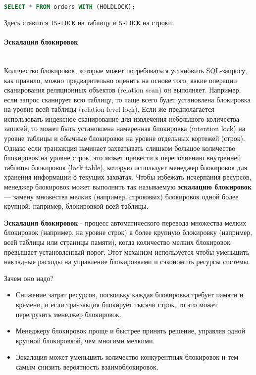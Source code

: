  \begin{lstlisting}[language=SQL]
     SELECT * FROM orders WITH (HOLDLOCK);
 \end{lstlisting}
 
 Здесь ставится \texttt{IS-LOCK} на таблицу и \texttt{S-LOCK} на строки.

\paragraph{Эскалация блокировок} ~\\

Количество блокировок, которые может потребоваться установить SQL-запросу, как правило, можно предварительно оценить на основе того, какие операции сканирования реляционных объектов (relation scan) он выполняет. Например, если запрос сканирует всю таблицу, то чаще всего будет установлена блокировка на уровне всей таблицы (relation-level lock). Если же предполагается использовать индексное сканирование для извлечения небольшого количества записей, то может быть установлена намеренная блокировка (intention lock) на уровне таблицы и обычные блокировки на уровне отдельных кортежей (строк). Однако если транзакция начинает захватывать слишком большое количество блокировок на уровне строк, это может привести к переполнению внутренней таблицы блокировок (lock table), которую использует менеджер блокировок для хранения информации о текущих захватах. Чтобы избежать исчерпания ресурсов, менеджер блокировок может выполнить так называемую \textbf{эскалацию блокировок} — замену множества мелких (например, строковых) блокировок одной более крупной, например, блокировкой всей таблицы. \autocites[ch.18]{Silberschatz}

\begin{grayquote}
    \textbf{Эскалация блокировок} - процесс автоматического перевода множества мелких блокировок (например, на уровне строк) в более крупную блокировку (например, всей таблицы или страницы памяти), когда количество мелких блокировок превышает установленный порог. Этот механизм используется чтобы уменьшить накладные расходы на управление блокировками и сэкономить ресурсы системы.
\end{grayquote}

Зачем оно надо?
\begin{itemize}
    \item Снижение затрат ресурсов, поскольку каждая блокировка требует памяти и времени, и если транзакция блокирует тысячи строк, то это может перегрузить менеджер блокировок.
    \item Менеджеру блокировок проще и быстрее принять решение, управляя одной крупной блокировкой, чем многими мелкими.
    \item Эскалация может уменьшить количество конкурентных блокировок и тем самым снизить вероятность взаимоблокировок.
\end{itemize}

